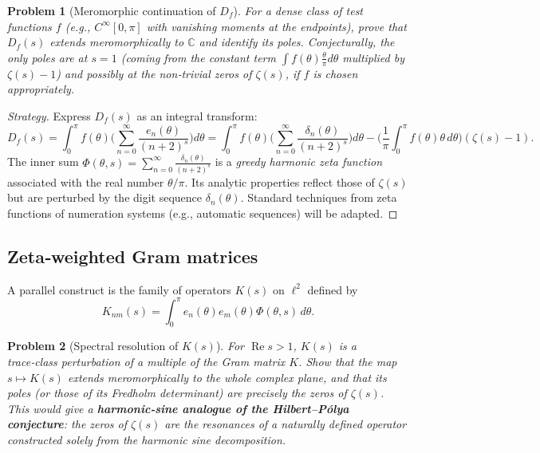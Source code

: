 \documentclass[11pt,a4paper]{article}
\newtheorem{problem}{Problem}[section]
\begin{document}
\begin{problem}[Meromorphic continuation of \(D_f\)]
\label{prob:contD}
For a dense class of test functions \(f\) (e.g., \(C^\infty[0,\pi]\) with vanishing moments at the endpoints), prove that \(D_f(s)\) extends meromorphically to \(\mathbb{C}\) and identify its poles. Conjecturally, the only poles are at \(s=1\) (coming from the constant term \(\int f(\theta)\frac{\theta}{\pi}d\theta\) multiplied by \(\zeta(s)-1\)) and possibly at the non‑trivial zeros of \(\zeta(s)\), if \(f\) is chosen appropriately.
\end{problem}

\begin{proof}[Strategy]
Express \(D_f(s)\) as an integral transform:
\[
D_f(s) = \int_0^\pi f(\theta) \Big( \sum_{n=0}^\infty \frac{e_n(\theta)}{(n+2)^s} \Big) d\theta
       = \int_0^\pi f(\theta) \Big( \sum_{n=0}^\infty \frac{\delta_n(\theta)}{(n+2)^s} \Big) d\theta 
         - \Big( \frac{1}{\pi}\int_0^\pi f(\theta)\theta\,d\theta \Big) (\zeta(s)-1).
\]
The inner sum \(\Phi(\theta,s) = \sum_{n=0}^\infty \frac{\delta_n(\theta)}{(n+2)^s}\) is a \emph{greedy harmonic zeta function} associated with the real number \(\theta/\pi\). Its analytic properties reflect those of \(\zeta(s)\) but are perturbed by the digit sequence \(\delta_n(\theta)\). Standard techniques from zeta functions of numeration systems (e.g., automatic sequences) will be adapted.
\end{proof}

\subsection{Zeta‑weighted Gram matrices}

A parallel construct is the family of operators \(K(s)\) on \(\ell^2\) defined by
\[
K_{nm}(s) = \int_0^\pi e_n(\theta) e_m(\theta) \Phi(\theta,s) \, d\theta .
\]

\begin{problem}[Spectral resolution of \(K(s)\)]
\label{prob:Kspec}
For \(\operatorname{Re} s>1\), \(K(s)\) is a trace‑class perturbation of a multiple of the Gram matrix \(K\). Show that the map \(s\mapsto K(s)\) extends meromorphically to the whole complex plane, and that its poles (or those of its Fredholm determinant) are precisely the zeros of \(\zeta(s)\). This would give a \textbf{harmonic‑sine analogue of the Hilbert–Pólya conjecture}: the zeros of \(\zeta(s)\) are the resonances of a naturally defined operator constructed solely from the harmonic sine decomposition.
\end{problem}
\end{document}
